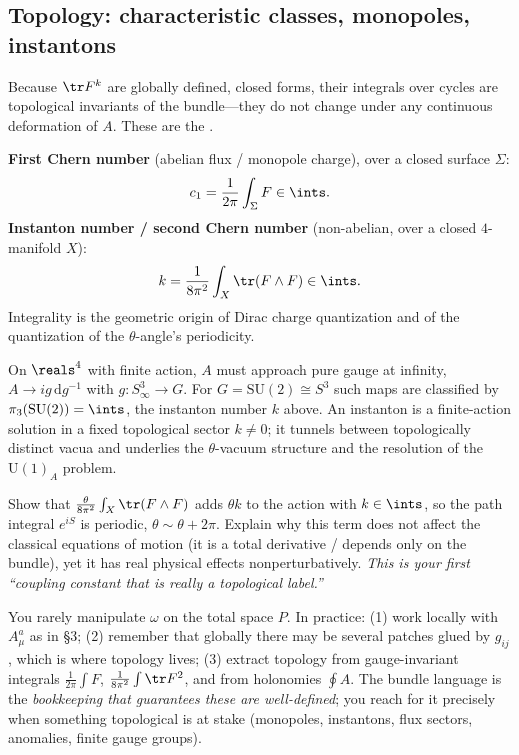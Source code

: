 \documentclass[11pt]{article}
\newcommand{\dd}{\mathrm{d}}                 %
\begin{document}
\subsection{Topology: characteristic classes, monopoles, instantons}
\label{sec:topology}

Because $\tr F^k$ are globally defined, closed forms, their integrals over cycles are
topological invariants of the bundle---they do not change under any continuous
deformation of $A$. These are the .

\begin{eequation}
\textbf{First Chern number} (abelian flux / monopole charge), over a closed surface
$\Sigma$:
\[
c_1 = \frac{1}{2\pi}\int_\Sigma F \in \ints.
\]
\textbf{Instanton number / second Chern number} (non-abelian, over a closed $4$-manifold
$X$):
\[
k = \frac{1}{8\pi^2}\int_X \tr(F\wedge F) \in \ints.
\]
Integrality is the geometric origin of Dirac charge quantization and of the
quantization of the $\theta$-angle's periodicity.
\end{eequation}

\begin{eexample}[Instantons]
On $\reals^4$ with finite action, $A$ must approach pure gauge at infinity,
$A\to ig\,\dd g^{-1}$ with $g:S^3_\infty\to G$. For $G=\mathrm{SU}(2)\cong S^3$ such maps
are classified by $\pi_3(\mathrm{SU}(2))=\ints$, the instanton number $k$ above. An
instanton is a finite-action solution in a fixed topological sector $k\neq0$; it
tunnels between topologically distinct vacua and underlies the $\theta$-vacuum
structure and the resolution of the $\mathrm{U}(1)_A$ problem.
\end{eexample}

\begin{xca}
Show that $\frac{\theta}{8\pi^2}\int_X \tr(F\wedge F)$ adds $\theta k$ to the action with
$k\in\ints$, so the path integral $e^{iS}$ is periodic, $\theta\sim\theta+2\pi$. Explain
why this term does not affect the classical equations of motion (it is a total
derivative / depends only on the bundle), yet it has real physical effects
nonperturbatively. \emph{This is your first ``coupling constant that is really a
topological label.''}
\end{xca}

\begin{nnote}
You rarely manipulate $\omega$ on the total space $P$. In practice: (1) work locally
with $A_\mu^a$ as in \S3; (2) remember that globally there may be several patches glued
by $g_{ij}$, which is where topology lives; (3) extract topology from gauge-invariant
integrals $\frac{1}{2\pi}\int F$, $\frac{1}{8\pi^2}\int\tr F^2$, and from holonomies
$\oint A$. The bundle language is the \emph{bookkeeping that guarantees these are
well-defined}; you reach for it precisely when something topological is at stake
(monopoles, instantons, flux sectors, anomalies, finite gauge groups).
\end{nnote}
\end{document}
